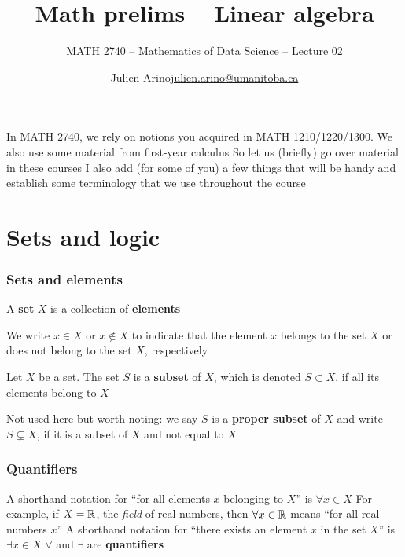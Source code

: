 \documentclass[aspectratio=169]{beamer}\usepackage[]{graphicx}\usepackage[]{xcolor}
\subtitle{MATH 2740 -- Mathematics of Data Science -- Lecture 02}
\author{\texorpdfstring{Julien Arino\newline\url{julien.arino@umanitoba.ca}}{Julien Arino}}
\institute{Department of Mathematics @ University of Manitoba}
\title{Math prelims -- Linear algebra}
\begin{document}



\begin{frame}
In MATH 2740, we rely on notions you acquired in MATH 1210/1220/1300. We also use some material from first-year calculus
\vfill
So let us (briefly) go over material in these courses
\vfill
I also add (for some of you) a few things that will be handy and establish some terminology that we use throughout the course
\end{frame}



\section{Sets and logic}

\begin{frame}
\frametitle{Sets and elements}
	\begin{definition}[Set]
		A \textbf{set} $X$ is a collection of \textbf{elements}
	\end{definition}
	We write $x\in X$ or $x\not\in X$ to indicate that the element $x$ belongs to
	the set $X$ or does not belong to the set $X$, respectively
	\vfill
	\begin{definition}[Subset]
		Let $X$ be a set. The set $S$ is a \textbf{subset} of $X$, which is denoted
		$S\subset X$, if all its elements belong to $X$
	\end{definition}
Not used here but worth noting: we say $S$ is a \textbf{proper subset} of $X$ and write $S\subsetneq X$, if it is a subset of $X$ and not equal to $X$
\end{frame}


\begin{frame}
\frametitle{Quantifiers}
	A shorthand notation for ``for all elements $x$ belonging to $X$'' is $\forall x\in X$
	\vfill
	For example, if $X=\mathbb{R}$, the \emph{field} of real numbers, then $\forall x\in\mathbb{R}$ means ``for all real numbers $x$''
	\vfill
	A shorthand notation for ``there exists an element $x$ in the set $X$'' is
	$\exists x\in X$
	\vfill
	$\forall$ and $\exists$ are \textbf{quantifiers}
\end{frame}
\end{document}
